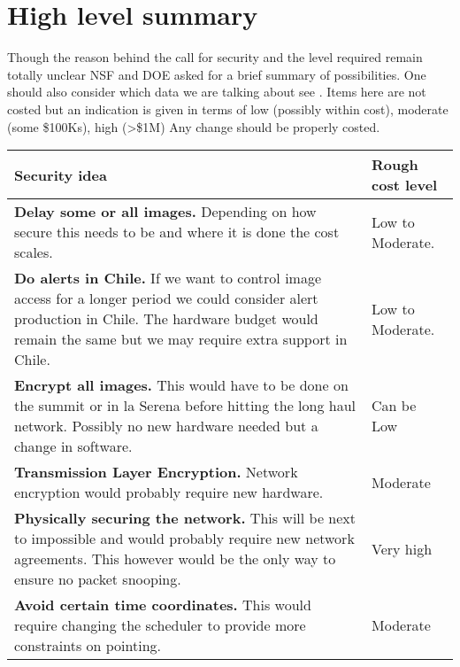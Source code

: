 \section{High level summary}\label{sec:sum}
Though the reason behind the call for security and the level required remain totally unclear
NSF and DOE asked for a brief summary of possibilities.
One should also consider which data we are talking about see .
Items here are not costed but an indication is given in terms of low (possibly within cost), moderate (some \$100Ks), high (>\$1M)
Any change should be properly costed.


\begin{longtable}{p{} p{}}\hline
\textbf{Security idea} & \textbf{Rough cost level}  \\\hline
 {\bf Delay some or all images.} Depending on how secure this needs to be and where it is done the cost scales.  & Low to Moderate.\\
 {\bf Do alerts in Chile.} If we want to control image access for a longer period we could consider alert production in Chile. The hardware budget would remain the same but we may require extra support in Chile.  & Low to Moderate.\\
{\bf Encrypt all images.} This would have to be done on the summit or in la Serena before hitting the long haul network. Possibly no new hardware needed but a change in software.  & Can be Low \\
{\bf Transmission Layer Encryption.} Network encryption would probably require new hardware. & Moderate \\
{\bf Physically securing the network.} This will be next to impossible and would probably require new network agreements. This however would be the only way to ensure no packet snooping. & Very high \\
{\bf Avoid certain time coordinates.} This would require changing the scheduler to provide more constraints on pointing. &  Moderate  \\\hline
\end{longtable}
